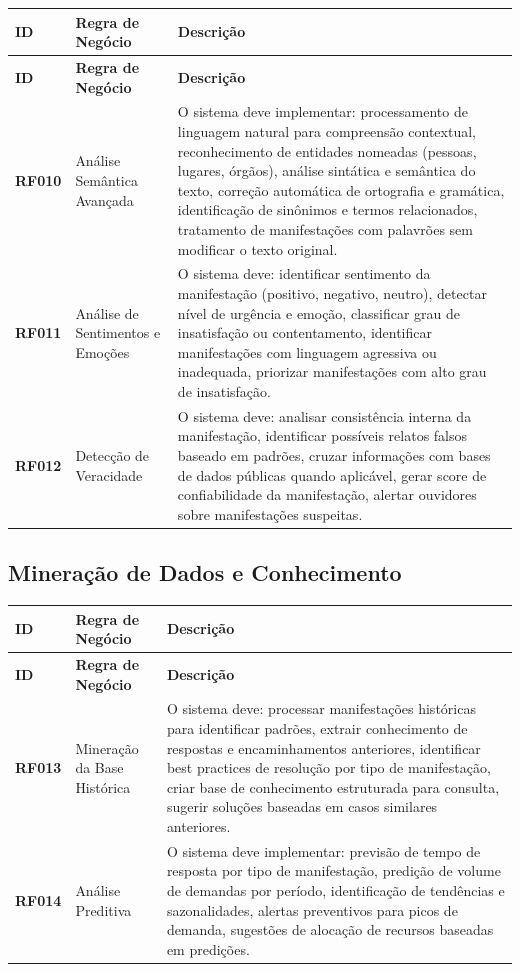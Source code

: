 \documentclass[12pt,a4paper]{article}
\newcommand{\rf}[1]{\textbf{\color{primaryblue}RF#1}}
\begin{document}
\begin{longtable}{|p{2cm}|p{5cm}|p{8cm}|}
\hline
\textbf{ID} & \textbf{Regra de Negócio} & \textbf{Descrição} \\
\hline
\endfirsthead
\hline
\textbf{ID} & \textbf{Regra de Negócio} & \textbf{Descrição} \\
\hline
\endhead

\rf{010} & Análise Semântica Avançada & O sistema deve implementar: processamento de linguagem natural para compreensão contextual, reconhecimento de entidades nomeadas (pessoas, lugares, órgãos), análise sintática e semântica do texto, correção automática de ortografia e gramática, identificação de sinônimos e termos relacionados, tratamento de manifestações com palavrões sem modificar o texto original. \\
\hline

\rf{011} & Análise de Sentimentos e Emoções & O sistema deve: identificar sentimento da manifestação (positivo, negativo, neutro), detectar nível de urgência e emoção, classificar grau de insatisfação ou contentamento, identificar manifestações com linguagem agressiva ou inadequada, priorizar manifestações com alto grau de insatisfação. \\
\hline

\rf{012} & Detecção de Veracidade & O sistema deve: analisar consistência interna da manifestação, identificar possíveis relatos falsos baseado em padrões, cruzar informações com bases de dados públicas quando aplicável, gerar score de confiabilidade da manifestação, alertar ouvidores sobre manifestações suspeitas. \\
\hline

\end{longtable}

\subsection{Mineração de Dados e Conhecimento}

\begin{longtable}{|p{2cm}|p{5cm}|p{8cm}|}
\hline
\textbf{ID} & \textbf{Regra de Negócio} & \textbf{Descrição} \\
\hline
\endfirsthead
\hline
\textbf{ID} & \textbf{Regra de Negócio} & \textbf{Descrição} \\
\hline
\endhead

\rf{013} & Mineração da Base Histórica & O sistema deve: processar manifestações históricas para identificar padrões, extrair conhecimento de respostas e encaminhamentos anteriores, identificar best practices de resolução por tipo de manifestação, criar base de conhecimento estruturada para consulta, sugerir soluções baseadas em casos similares anteriores. \\
\hline

\rf{014} & Análise Preditiva & O sistema deve implementar: previsão de tempo de resposta por tipo de manifestação, predição de volume de demandas por período, identificação de tendências e sazonalidades, alertas preventivos para picos de demanda, sugestões de alocação de recursos baseadas em predições. \\
\hline

\end{longtable}
\end{document}
